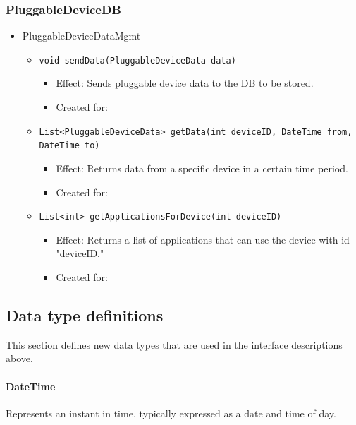     \subsubsection{PluggableDeviceDB}
        \begin{itemize}
            \item PluggableDeviceDataMgmt
            \begin{itemize}
                \item \texttt{void sendData(PluggableDeviceData data)}
                \begin{itemize}
                    \item Effect: Sends pluggable device data to the DB to be stored.
                    \item Created for:
                \end{itemize}
                \item \texttt{List<PluggableDeviceData> getData(int deviceID, DateTime from, DateTime to)}
                \begin{itemize}
                    \item Effect: Returns data from a specific device in a certain time period.
                    \item Created for:
                \end{itemize}
                \item \texttt{List<int> getApplicationsForDevice(int deviceID)}
                \begin{itemize}
                    \item Effect: Returns a list of applications that can use the device with id "deviceID."
                    \item Created for:
                \end{itemize}
            \end{itemize}
        \end{itemize}


\subsection{Data type definitions}
    This section defines new data types that are used in the interface descriptions above.

    \paragraph{DateTime} Represents an instant in time, typically expressed as a date and time of day.


